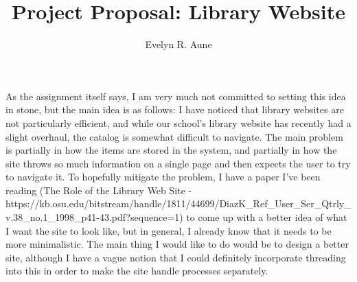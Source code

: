 \documentclass[12pt,letterpaper,notitlepage]{report}
\title{Project Proposal: Library Website}
\author{Evelyn R. Aune}
\begin{document}
\maketitle

As the assignment itself says, I am very much not committed to setting this idea in stone, but the main idea is as follows: I have noticed that library websites are not particularly efficient, and while our school's library website has recently had a slight overhaul, the catalog is somewhat difficult to navigate. The main problem is partially in how the items are stored in the system, and partially in how the site throws so much information on a single page and then expects the user to try to navigate it. To hopefully mitigate the problem, I have a paper I've been reading (The Role of the Library Web Site - https://kb.osu.edu/bitstream/handle/1811/44699/DiazK_Ref_User_Ser_Qtrly_v.38_no.1_1998_p41-43.pdf?sequence=1) to come up with a better idea of what I want the site to look like, but in general, I already know that it needs to be more minimalistic. The main thing I would like to do would be to design a better site, although I have a vague notion that I could definitely incorporate threading into this in order to make the site handle processes separately.
\end{document}
